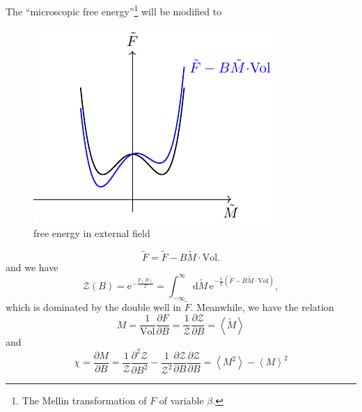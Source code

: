 
The ``microscopic free energy''\footnote{The Mellin transformation of $F$ of variable $\beta$.} will be modified to
\begin{figure}[h]
    \centering
    \includegraphics{figures/free_energy_in_external_field.pdf}
    \caption{free energy in external field}
\end{figure}
\begin{equation}
  \tilde{F} = \tilde{F} - B \tilde{M} \cdot \text{Vol}.
\end{equation}
and we have 
\begin{equation}
    \mathcal{Z}\left( B \right)  = \mathrm{e}^{- \frac{F\left( B \right)}{T}} = \int_{-\infty}^{\infty} \mathrm{d}\tilde{M} \, \mathrm{e}^{-\frac{1}{T} \left( \tilde{F} - B \tilde{M} \cdot \text{Vol} \right) } ,
\end{equation}
which is dominated by the double well in $\tilde{F}$.
Meanwhile, we have the relation
\begin{equation}
    M = \frac{1}{\text{Vol}} \frac{\partial F}{\partial B} = \frac{1}{\mathcal{Z}} \frac{\partial \mathcal{Z}}{\partial B} = \left< \tilde{M} \right> 
\end{equation}
and
\begin{equation}
  \chi = \frac{\partial M}{\partial B} = \frac{1}{\mathcal{Z}} \frac{\partial^2 \mathcal{Z}}{\partial B^2} - \frac{1}{\mathcal{Z}^{2}} \frac{\partial \mathcal{Z}}{\partial B} \frac{\partial \mathcal{Z}}{\partial B} = \left< M^{2} \right> - \left< M \right>^{2}
\end{equation}